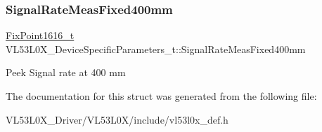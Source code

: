 \subsubsection{\texorpdfstring{Signal\+Rate\+Meas\+Fixed400mm}{SignalRateMeasFixed400mm}}
{\footnotesize\ttfamily \hyperlink{vl53l0x__types_8h_afb910790161809fc76e1a274a6349384}{Fix\+Point1616\+\_\+t} V\+L53\+L0\+X\+\_\+\+Device\+Specific\+Parameters\+\_\+t\+::\+Signal\+Rate\+Meas\+Fixed400mm}

Peek Signal rate at 400 mm 

The documentation for this struct was generated from the following file\+:\begin{DoxyCompactItemize}
\item 
V\+L53\+L0\+X\+\_\+\+Driver/\+V\+L53\+L0\+X/include/vl53l0x\+\_\+def.\+h\end{DoxyCompactItemize}
